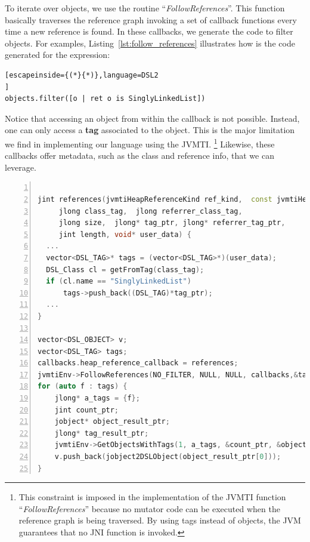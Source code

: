 To iterate over objects, we use the routine ``\textit{FollowReferences}''.
This function basically traverses the reference graph invoking a set of callback functions every time a new reference is found. 
In these callbacks, we generate the code to filter objects.
For examples, Listing~\ref{lst:follow_references} illustrates how is the code generated for the expression:

\begin{lstlisting}[escapeinside={(*}{*)},language=DSL2
]
objects.filter([o | ret o is SinglyLinkedList])
\end{lstlisting}

Notice that accessing an object from within the callback is not possible.
Instead, one can only access a \textbf{tag} associated to the object.
This is the major limitation we find in implementing our language using the JVMTI.
\footnote{This constraint is imposed in the implementation of the JVMTI function ``\textit{FollowReferences}'' because no mutator code can be executed when the reference graph is being traversed. By using tags instead of objects, the JVM guarantees that no JNI function is invoked.}
Likewise, these callbacks offer metadata, such as the class and reference info, that we can leverage.

\begin{lstlisting}[language=C++, frame=L, numbers=left,numberstyle=\color{black}\scriptsize, xleftmargin=1.5\parindent, label={lst:follow_references},
caption={Code generated for the expression \textit{objects.filter}. This is a simplified version in C++14}]

jint references(jvmtiHeapReferenceKind ref_kind,  const jvmtiHeapReferenceInfo* ref_info, 
     jlong class_tag,  jlong referrer_class_tag, 
     jlong size,  jlong* tag_ptr, jlong* referrer_tag_ptr, 
     jint length, void* user_data) {
  ...
  vector<DSL_TAG>* tags = (vector<DSL_TAG>*)(user_data);
  DSL_Class cl = getFromTag(class_tag);
  if (cl.name == "SinglyLinkedList")
	  tags->push_back((DSL_TAG)*tag_ptr);
  ...
}

vector<DSL_OBJECT> v;
vector<DSL_TAG> tags;
callbacks.heap_reference_callback = references;
jvmtiEnv->FollowReferences(NO_FILTER, NULL, NULL, callbacks,&tags);
for (auto f : tags) {
	jlong* a_tags = {f};
	jint count_ptr;
	jobject* object_result_ptr;
	jlong* tag_result_ptr;
	jvmtiEnv->GetObjectsWithTags(1, a_tags, &count_ptr, &object_result_ptr, &tag_result_ptr);
	v.push_back(jobject2DSLObject(object_result_ptr[0]));
}

\end{lstlisting}

